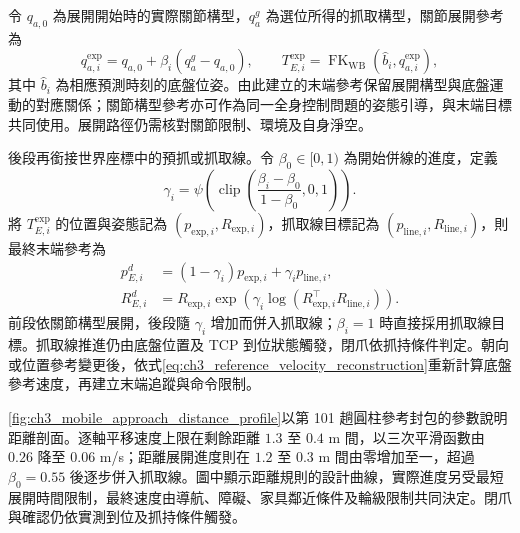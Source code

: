 令 $q_{a,0}$ 為展開開始時的實際關節構型，$q_a^g$ 為選位所得的抓取構型，關節展開參考為
\begin{equation}
    q_{a,i}^{\mathrm{exp}}
      =q_{a,0}+\beta_i(q_a^g-q_{a,0}),
    \qquad
    T_{E,i}^{\mathrm{exp}}
      =\operatorname{FK}_{\mathrm{WB}}(\widehat b_i,q_{a,i}^{\mathrm{exp}}),
    \label{eq:ch3_joint_space_unfold_reference}
\end{equation}
其中 $\widehat b_i$ 為相應預測時刻的底盤位姿。由此建立的末端參考保留展開構型與底盤運動的對應關係；關節構型參考亦可作為同一全身控制問題的姿態引導，與末端目標共同使用。展開路徑仍需核對關節限制、環境及自身淨空。

後段再銜接世界座標中的預抓或抓取線。令 $\beta_0\in[0,1)$ 為開始併線的進度，定義
\begin{equation}
    \gamma_i=\psi\!\left(\operatorname{clip}
        \left(\frac{\beta_i-\beta_0}{1-\beta_0},0,1\right)\right).
    \label{eq:ch3_late_merge_weight}
\end{equation}
將 $T_{E,i}^{\mathrm{exp}}$ 的位置與姿態記為 $(p_{\mathrm{exp},i},R_{\mathrm{exp},i})$，抓取線目標記為 $(p_{\mathrm{line},i},R_{\mathrm{line},i})$，則最終末端參考為
\begin{equation}
    \begin{aligned}
        p_{E,i}^{d}
        &=(1-\gamma_i)p_{\mathrm{exp},i}+\gamma_i p_{\mathrm{line},i},\\
        R_{E,i}^{d}
        &=R_{\mathrm{exp},i}\exp\!\left(
          \gamma_i\log(R_{\mathrm{exp},i}^{\top}R_{\mathrm{line},i})\right).
    \end{aligned}
    \label{eq:ch3_continuous_approach_reference}
\end{equation}
前段依關節構型展開，後段隨 $\gamma_i$ 增加而併入抓取線；$\beta_i=1$ 時直接採用抓取線目標。抓取線推進仍由底盤位置及 TCP 到位狀態觸發，閉爪依抓持條件判定。朝向或位置參考變更後，依式\eqref{eq:ch3_reference_velocity_reconstruction}重新計算底盤參考速度，再建立末端追蹤與命令限制。


\cref{fig:ch3_mobile_approach_distance_profile}以第 101 趟圓柱參考封包的參數說明距離剖面。逐軸平移速度上限在剩餘距離 $1.3$ 至 $0.4$ m 間，以三次平滑函數由 $0.26$ 降至 $0.06$ m/s；距離展開進度則在 $1.2$ 至 $0.3$ m 間由零增加至一，超過 $\beta_0=0.55$ 後逐步併入抓取線。圖中顯示距離規則的設計曲線，實際進度另受最短展開時間限制，最終速度由導航、障礙、家具鄰近條件及輪級限制共同決定。閉爪與確認仍依實測到位及抓持條件觸發。

